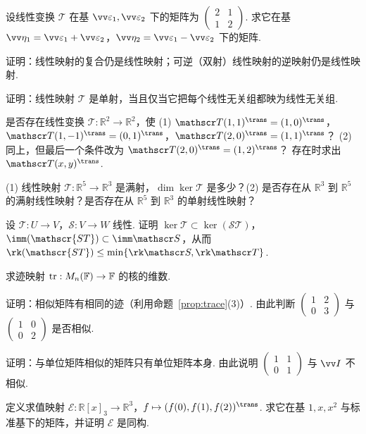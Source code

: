 {\begin{exA}
			\item\label{ex:lmap:A20} 设线性变换 $\mathscr T$ 在基 $\vv\varepsilon_1,\vv\varepsilon_2$ 下的矩阵为 $\begin{pmatrix}2&1\\1&2\end{pmatrix}$. 求它在基 $\vv\eta_1=\vv\varepsilon_1+\vv\varepsilon_2$，$\vv\eta_2=\vv\varepsilon_1-\vv\varepsilon_2$ 下的矩阵.
			\item\label{ex:lmap:A21} 证明：线性映射的复合仍是线性映射；可逆（双射）线性映射的逆映射仍是线性映射.
			\item\label{ex:lmap:A22} 证明：线性映射 $\mathscr T$ 是单射，当且仅当它把每个线性无关组都映为线性无关组.
			\item\label{ex:lmap:A23} 是否存在线性变换 $\mathscr T:\mathbb{R}^2\to\mathbb{R}^2$，使
			(1) $\mathscr T(1,1)^\trans=(1,0)^\trans$，$\mathscr T(1,-1)^\trans=(0,1)^\trans$，$\mathscr T(2,0)^\trans=(1,1)^\trans$？
			(2) 同上，但最后一个条件改为 $\mathscr T(2,0)^\trans=(1,2)^\trans$？
			存在时求出 $\mathscr T(x,y)^\trans$.
			\item\label{ex:lmap:A24} (1) 线性映射 $\mathscr T:\mathbb{R}^5\to\mathbb{R}^3$ 是满射，$\dim\ker\mathscr T$ 是多少？(2) 是否存在从 $\mathbb{R}^3$ 到 $\mathbb{R}^5$ 的满射线性映射？是否存在从 $\mathbb{R}^5$ 到 $\mathbb{R}^3$ 的单射线性映射？
			\item\label{ex:lmap:A25} 设 $\mathscr T:U\to V$，$\mathscr S:V\to W$ 线性. 证明 $\ker\mathscr T\subset\ker(\mathscr{ST})$，$\imm(\mathscr{ST})\subset\imm\mathscr S$，从而 $\rk(\mathscr{ST})\le\min\{\rk\mathscr S,\rk\mathscr T\}$.
			\item\label{ex:lmap:A26} 求迹映射 $\operatorname{tr}:M_n(\mathbb{F})\to\mathbb{F}$ 的核的维数.
			\item\label{ex:lmap:A27} 证明：相似矩阵有相同的迹（利用命题~\ref{prop:trace}(3)）. 由此判断 $\begin{pmatrix}1&2\\0&3\end{pmatrix}$ 与 $\begin{pmatrix}1&0\\0&2\end{pmatrix}$ 是否相似.
			\item\label{ex:lmap:A28} 证明：与单位矩阵相似的矩阵只有单位矩阵本身. 由此说明 $\begin{pmatrix}1&1\\0&1\end{pmatrix}$ 与 $\vv I$ 不相似.
			\item\label{ex:lmap:A29} 定义求值映射 $\mathscr E:\mathbb{R}[x]_3\to\mathbb{R}^3$，$f\mapsto(f(0),f(1),f(2))^\trans$. 求它在基 $1,x,x^2$ 与标准基下的矩阵，并证明 $\mathscr E$ 是同构.

\end{exA}}
